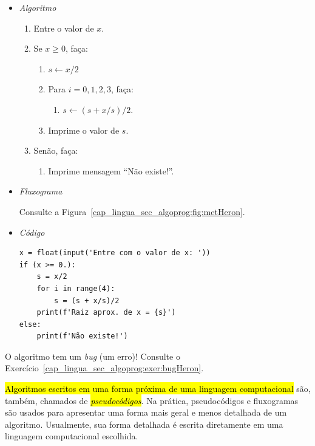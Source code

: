 \begin{ex}
  \begin{itemize}
  \item \emph{Algoritmo}
    \begin{enumerate}
    \item Entre o valor de $x$.
    \item Se $x\geq 0$, faça:
      \begin{enumerate}
      \item $s \leftarrow x/2$
      \item Para $i = 0,1,2,3$, faça:
        \begin{enumerate}
        \item $s \leftarrow (s + x/s)/2$.
        \end{enumerate}
      \item Imprime o valor de $s$.
      \end{enumerate}
    \item Senão, faça:
      \begin{enumerate}
      \item Imprime mensagem ``Não existe!''.
      \end{enumerate}
    \end{enumerate}

  \item \emph{Fluxograma}
  
    Consulte a Figura~\ref{cap_lingua_sec_algoprog:fig:metHeron}.
    
  \item \emph{Código {\python}}

\begin{lstlisting}[caption=metHeron.py,label=cap_lingua_sec_algoprog:cod:metHeron, xrightmargin=2.5em]
x = float(input('Entre com o valor de x: '))
if (x >= 0.):
    s = x/2
    for i in range(4):
        s = (s + x/s)/2
    print(f'Raiz aprox. de x = {s}')
else:
    print(f'Não existe!')
\end{lstlisting}

  \end{itemize}

  O algoritmo tem um \textit{bug} (um erro)! Consulte o Exercício~\ref{cap_lingua_sec_algoprog:exer:bugHeron}.
\end{ex}

\hl{Algoritmos escritos em uma forma próxima de uma linguagem computacional} são, também, chamados de \hl{\emph{pseudocódigos}}. Na prática, pseudocódigos e fluxogramas são usados para apresentar uma forma mais geral e menos detalhada de um algoritmo. Usualmente, sua forma detalhada é escrita diretamente em uma linguagem computacional escolhida.

